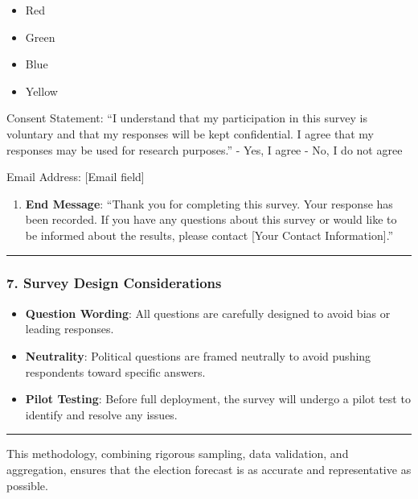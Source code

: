 \documentclass[
  letterpaper,
  DIV=11,
  numbers=noendperiod]{scrartcl}
\providecommand{\tightlist}{%
  \setlength{\itemsep}{0pt}\setlength{\parskip}{0pt}}\usepackage{longtable,booktabs,array}
\begin{document}
\begin{itemize}
\tightlist
\item
  Red
\item
  Green
\item
  Blue
\item
  Yellow
\end{itemize}

Consent Statement: ``I understand that my participation in this survey
is voluntary and that my responses will be kept confidential. I agree
that my responses may be used for research purposes.'' - Yes, I agree -
No, I do not agree

Email Address: {[}Email field{]}

\begin{enumerate}
\def\labelenumi{\arabic{enumi}.}
\setcounter{enumi}{6}
\tightlist
\item
  \textbf{End Message}: ``Thank you for completing this survey. Your
  response has been recorded. If you have any questions about this
  survey or would like to be informed about the results, please contact
  {[}Your Contact Information{]}.''
\end{enumerate}

\begin{center}\rule{0.5\linewidth}{0.5pt}\end{center}

\subsubsection{\texorpdfstring{\textbf{7. Survey Design
Considerations}}{7. Survey Design Considerations}}\label{survey-design-considerations}

\begin{itemize}
\tightlist
\item
  \textbf{Question Wording}: All questions are carefully designed to
  avoid bias or leading responses.
\item
  \textbf{Neutrality}: Political questions are framed neutrally to avoid
  pushing respondents toward specific answers.
\item
  \textbf{Pilot Testing}: Before full deployment, the survey will
  undergo a pilot test to identify and resolve any issues.
\end{itemize}

\begin{center}\rule{0.5\linewidth}{0.5pt}\end{center}

This methodology, combining rigorous sampling, data validation, and
aggregation, ensures that the election forecast is as accurate and
representative as possible.
\end{document}
